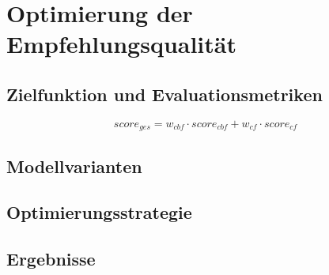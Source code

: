 \section{Optimierung der Empfehlungsqualität}

\subsection{Zielfunktion und Evaluationsmetriken}


\[
score_{ges} = w_{cbf} \cdot score_{cbf} + w_{cf} \cdot score_{cf}
\]

\subsection{Modellvarianten}

\subsection{Optimierungsstrategie}


\subsection{Ergebnisse}
% 
% 
% 
% 
% 
% 
% 
% 
% 
% 
% 
% 